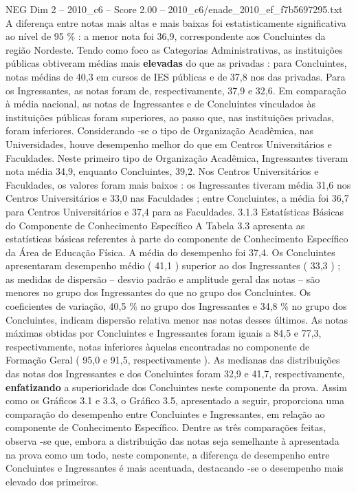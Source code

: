 \begin{textsample}{NEG Dim 2 – 2010\_c6 – Score 2.00 – 2010\_c6/enade\_2010\_ef\_f7b5697295.txt}
A diferença entre notas mais altas e mais baixas foi estatisticamente significativa ao nível de 95 \% : a menor nota foi 36,9, correspondente aos Concluintes da região Nordeste.
Tendo como foco as Categorias Administrativas, as instituições públicas obtiveram médias mais \textbf{elevadas} do que as privadas : para Concluintes, notas médias de 40,3 em cursos de IES públicas e de 37,8 nos das privadas.
Para os Ingressantes, as notas foram de, respectivamente, 37,9 e 32,6.
Em comparação à média nacional, as notas de Ingressantes e de Concluintes vinculados às instituições públicas foram superiores, ao passo que, nas instituições privadas, foram inferiores.
Considerando -se o tipo de Organização Acadêmica, nas Universidades, houve desempenho melhor do que em Centros Universitários e Faculdades.
Neste primeiro tipo de Organização Acadêmica, Ingressantes tiveram nota média 34,9, enquanto Concluintes, 39,2.
Nos Centros Universitários e Faculdades, os valores foram mais baixos : os Ingressantes tiveram média 31,6 nos Centros Universitários e 33,0 nas Faculdades ; entre Concluintes, a média foi 36,7 para Centros Universitários e 37,4 para as Faculdades. 3.1.3 Estatísticas Básicas do Componente de Conhecimento Específico A Tabela 3.3 apresenta as estatísticas básicas referentes à parte do componente de Conhecimento Específico da Área de Educação Física.
A média do desempenho foi 37,4.
Os Concluintes apresentaram desempenho médio ( 41,1 ) superior ao dos Ingressantes ( 33,3 ) ; as medidas de dispersão – desvio padrão e amplitude geral das notas – são menores no grupo dos Ingressantes do que no grupo dos Concluintes.
Os coeficientes de variação, 40,5 \% no grupo dos Ingressantes e 34,8 \% no grupo dos Concluintes, indicam dispersão relativa menor nas notas desses últimos.
As notas máximas obtidas por Concluintes e Ingressantes foram iguais a 84,5 e 77,3, respectivamente, notas inferiores àquelas encontradas no componente de Formação Geral ( 95,0 e 91,5, respectivamente ).
As medianas das distribuições das notas dos Ingressantes e dos Concluintes foram 32,9 e 41,7, respectivamente, \textbf{enfatizando} a superioridade dos Concluintes neste componente da prova.
Assim como os Gráficos 3.1 e 3.3, o Gráfico 3.5, apresentado a seguir, proporciona uma comparação do desempenho entre Concluintes e Ingressantes, em relação ao componente de Conhecimento Específico.
Dentre as três comparações feitas, observa -se que, embora a distribuição das notas seja semelhante à apresentada na prova como um todo, neste componente, a diferença de desempenho entre Concluintes e Ingressantes é mais acentuada, destacando -se o desempenho mais elevado dos primeiros.

\end{textsample}
